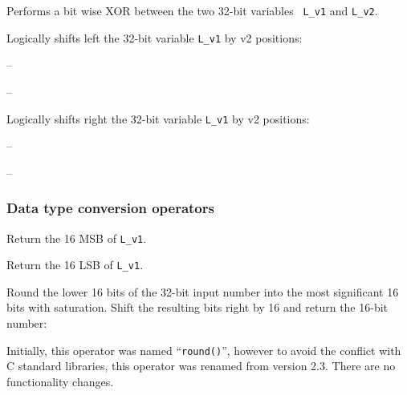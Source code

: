 Performs a bit wise XOR between the two 32-bit variables {\tt
L\_v1} and {\tt L\_v2}.


 

Logically shifts left the 32-bit variable {\tt L\_v1} by v2 positions:

 -- 

 -- 


 

Logically shifts right the 32-bit variable {\tt L\_v1} by v2
positions:

 -- 

 -- 


\subsubsection{Data type conversion operators}


Return the 16 MSB of {\tt L\_v1}.


Return the 16 LSB of {\tt L\_v1}.


Round the lower 16 bits of the 32-bit input number into the most
significant 16 bits with saturation. Shift the resulting bits
right by 16 and return the 16-bit number:


Initially, this operator was named ``{\tt round()}'', however to avoid
the conflict with C standard libraries, this operator was renamed from
version 2.3. There are no functionality changes.

